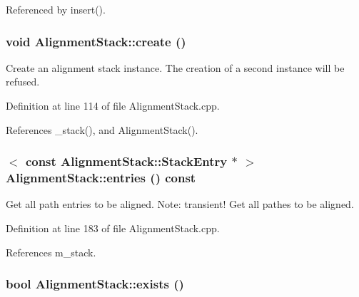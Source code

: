 Referenced by insert().\hypertarget{class_d_d4hep_1_1_alignments_1_1_alignment_stack_a1244b4fa8cde1f3991957f689810ae4c}{
\subsubsection[{create}]{\setlength{\rightskip}{0pt plus 5cm}void AlignmentStack::create ()}}
\label{class_d_d4hep_1_1_alignments_1_1_alignment_stack_a1244b4fa8cde1f3991957f689810ae4c}


Create an alignment stack instance. The creation of a second instance will be refused. 

Definition at line 114 of file AlignmentStack.cpp.

References \_\-stack(), and AlignmentStack().\hypertarget{class_d_d4hep_1_1_alignments_1_1_alignment_stack_abb950f98d95cf6c431ca7c8d3ca48fc0}{
\subsubsection[{entries}]{$<$ const {\bf AlignmentStack::StackEntry} $\ast$ $>$ AlignmentStack::entries () const}}
\label{class_d_d4hep_1_1_alignments_1_1_alignment_stack_abb950f98d95cf6c431ca7c8d3ca48fc0}


Get all path entries to be aligned. Note: transient! Get all pathes to be aligned. 

Definition at line 183 of file AlignmentStack.cpp.

References m\_\-stack.\hypertarget{class_d_d4hep_1_1_alignments_1_1_alignment_stack_aa2cbfdbfcd9a294c3f5487e5bf248b6a}{
\subsubsection[{exists}]{\setlength{\rightskip}{0pt plus 5cm}bool AlignmentStack::exists ()}}
\label{class_d_d4hep_1_1_alignments_1_1_alignment_stack_aa2cbfdbfcd9a294c3f5487e5bf248b6a}


